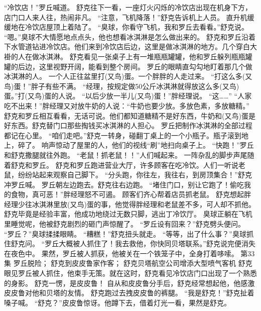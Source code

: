 \documentclass[a4paper,12pt,UTF8,twoside]{ctexbook}
\begin{document}
        “冷饮店！”罗丘喊道。 
        舒克往下一看，一座灯火闪烁的冷饮店出现在机身下方，店门口人来人往，热闹非凡。 
        “注意，飞机降落！”舒克告诉机上人员。 
        直升机缓缓地在冷饮店屋顶上着陆了。 
        “臭球，你看守飞机，我和罗丘去看看。”舒克说。 
        “嗯。”臭球不大情愿地点点头，他也想看冰淇淋是怎么做出来的。 
        舒克和罗丘沿着下水管道钻进冷饮店。他们来到冷饮店后边，这里是做冰淇淋的地方。几个穿白大褂的人在做冰淇淋。 
        舒克看见一张桌子上有一堆瓶瓶罐罐，他和罗丘躲列瓶瓶罐罐的后边，这里视野开阔，能看到整个房间。 
        罗丘的眼睛直勾勾地盯着那几个做冰淇淋的人。 
        一个人正往盆里打(又鸟)蛋。一个胖胖的人走过来。 
        “打这么多(又鸟)蛋！”胖子有些不满。 
        “经理，按规定做50公斤冰淇淋就得放这么多(又鸟)蛋。”打(又鸟)蛋的人说。 
        “以后少放一半儿(又鸟)蛋！”胖经理说。 
        “这……” 
        “人家吃不出来！”胖经理又对放牛奶的人说：“牛奶也要少放。多放色素，多放糖精。” 
        舒克和罗丘相互看看，无话可说。他们都知道糖精不是好东西，牛奶和(又鸟)蛋是好东西。舒克替门口那些掏钱买冰淇淋的人担心。 
        罗丘把制作冰淇淋的全部过程都记在心里。 
        “咱们走吧。”舒克一转身，碰翻丁桌上的一个小瓶子。瓶子滚到地上，碎了。 
        响声惊动了屋里的人，他们的视线“刷”地扫向桌子上。 
        “快跑！”罗丘和舒克撒腿就往外跑。 
        “老鼠！抓老鼠！！”人们喊起来。 
        一阵杂乱的脚步声尾随着舒克和罗丘。 
        舒克和罗丘跑进营业大厅，许多顾客在吃冷饮。人们一听说老鼠，纷纷站起来观察自己脚下。 
        “分头跑，你往左，我往右，到房顶集合！”舒克冲罗丘喊。 
        罗丘朝左边跑去。舒克往右边跑。 
        “堵住门口，别让它跑了！偷吃我的食物，真可恶！”胖经理怒不可遏。 
        顾客们齐心帮着店员抓老鼠。 
        舒克想起胖经理少往冰淇淋里放(又鸟)蛋的事，他觉得胖经理和老鼠差不多，可人却不抓他。 
        舒克毕竟是经验丰富，他成功地绕过无数只脚，逃出丁冷饮厅。 
        臭球正躺在飞机里睡觉呢，他被舒克剧烈的砸门声惊醒了。 
        “罗丘设有回来？”舒克劈头便问。 
        “罗丘？”臭球揉揉眼睛。 
        “糟糕！”舒克扭头就走。 
        “等等，出了什么事？”臭球抓住舒克问。 
        “罗丘大概被人抓住了！我去救他，你快同贝塔联系。”舒克说完便消失在夜色中。 
        果然，罗丘被人抓获，他被关在一个铁笼子中，全身打着哆嗦。   第33集 
        罗丘脱险； 
        舒克到皮皮鲁家作客； 
        舒克贝塔航空公司增添大型喷气客机   
        舒克眼见罗丘被人抓住，他束手无策。就在这时，舒克看见冷饮店门口出现了一个熟悉的身影。 
        舒克一愣，是皮皮鲁！ 
        自从和皮皮鲁分手后，舒克经常想起他，他感激皮皮鲁对他和贝塔的友情。 
        舒克跑过去拽皮皮鲁的裤腿。 
        “我是舒克！”舒克扯着嗓子喊。 
        “舒克？”皮皮鲁惊讶。他蹲下去，借着灯光一看，果然是舒克。 
\end{document}

